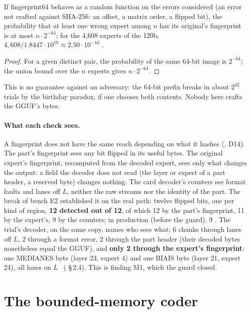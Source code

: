 \begin{proposition}\label{t2fmt:prop:collision}
If fingerprint64 behaves as a random function on the errors considered (an error not crafted against SHA-256: an offset, a matrix order, a flipped bit), the probability that at least one wrong expert among $n$ has its original's fingerprint is at most $n \cdot 2^{-64}$; for the 4{,}608 experts of the 120b, $4{,}608 / 1.8447\cdot10^{19} \approx 2.50\cdot10^{-16}$ \calc.
\end{proposition}
\begin{proof}
For a given distinct pair, the probability of the same 64-bit image is $2^{-64}$; the union bound over the $n$ experts gives $n \cdot 2^{-64}$.
\end{proof}
This is no guarantee against an adversary: the 64-bit prefix breaks in about $2^{32}$ trials by the birthday paradox, if one chooses both contents. Nobody here crafts the GGUF's bytes.

\paragraph{What each check sees.} A fingerprint does not have the same reach depending on what it hashes (, D14). The part's fingerprint sees any bit flipped in its useful bytes. The original expert's fingerprint, recomputed from the decoded expert, sees only what changes the output: a field the decoder does not read (the layer or expert of a part header, a reserved byte) changes nothing. The card decoder's counters see format faults and lanes off $L$, neither the raw streams nor the identity of the part. The break of bench E2 established it on the real path: twelve flipped bits, one per kind of region, \textbf{12 detected out of 12}, of which 12 by the part's fingerprint, 11 by the expert's, 9 by the counters; in production (before the guard), 9 \mes. The trial's decoder, on the same copy, names who sees what: 6 chunks through lanes off $L$, 2 through a format error, 2 through the part header (their decoded bytes nonetheless equal the GGUF), and \textbf{only 2 through the expert's fingerprint}: one MEDIANES byte (layer 23, expert 4) and one BIAIS byte (layer 21, expert 24), all lanes on $L$ \mes~( §\,2.4). This is finding M1, which the guard closed.

\section{The bounded-memory coder}\label{t2fmt:sec:codeur}

